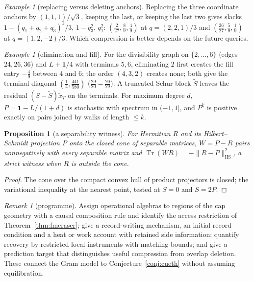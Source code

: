 \documentclass[aps,pra,onecolumn,superscriptaddress,nofootinbib,10pt]{revtex4-2}
\newtheorem{proposition}[theorem]{Proposition}
\theoremstyle{definition}
\theoremstyle{remark}
\newtheorem{remark}[theorem]{Remark}
\newtheorem{example}[theorem]{Example}
\newcommand{\tr}{\operatorname{Tr}}
\begin{document}
\begin{example}[replacing versus deleting anchors]\label{ex:fmcentroid}
Replacing the three coordinate anchors by $(1,1,1)/\sqrt3$, keeping the last, or keeping the last two gives slacks
$1-(q_1+q_2+q_3)^2/3$, $1-q_3^2$, $q_1^2$: $(\tfrac2{27},\tfrac89,\tfrac49)$ at $q=(2,2,1)/3$ and $(\tfrac{26}{27},\tfrac59,\tfrac19)$ at $q=(1,2,-2)/3$.  Which compression is
better depends on the future queries.
\end{example}

\begin{example}[elimination and fill]\label{ex:fmfill}
For the divisibility graph on $\{2,\dots,6\}$ (edges $24,26,36$) and $L+\mathbf1/4$ with terminals $5,6$, eliminating $2$ first creates the
fill entry $-\tfrac49$ between $4$ and $6$; the order $(4,3,2)$ creates none; both give the terminal diagonal $(\tfrac14,\tfrac{441}{580})$
($\tfrac{29}{20}-\tfrac{20}{29}$).  A truncated Schur block $\tilde S$ leaves the residual $(S-\tilde S)\tilde x_T$ on the terminals.  For maximum degree $d$,
$P=\mathbf1-L/(1+d)$ is stochastic with spectrum in $(-1,1]$, and $P^k$ is positive exactly on pairs joined by walks of length $\le k$.
\end{example}

\begin{proposition}[a separability witness]\label{prop:fmseparable}
For Hermitian $R$ and its Hilbert--Schmidt projection $P$ onto the closed cone of separable matrices, $W=P-R$
pairs nonnegatively with every separable matrix and $\tr(WR)=-\lVert R-P\rVert_{\mathrm{HS}}^2$, a strict witness when $R$ is outside the cone.
\end{proposition}
\begin{proof}
The cone over the compact convex hull of product projectors is closed; the variational inequality at
the nearest point, tested at $S=0$ and $S=2P$.
\end{proof}

\begin{remark}[programme]\label{rem:fmprogramme}
Assign operational algebras to regions of the cap geometry with a causal composition rule and identify
the access restriction of Theorem~\ref{thm:fmeraser}; give a record-writing mechanism, an initial record condition
and a heat or work account with retained side information; quantify recovery by restricted local
instruments with matching bounds; and give a prediction target that distinguishes useful compression
from overlap deletion.  These connect the Gram model to Conjecture~\ref{conj:cueth} without assuming
equilibration.
\end{remark}
\end{document}
